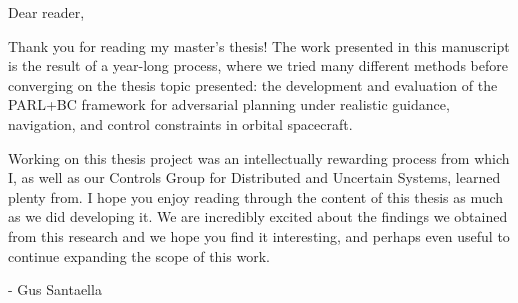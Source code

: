 \begin{preface}		%

Dear reader,

Thank you for reading my master's thesis! The work presented in this manuscript is the result of a year-long process, where we tried many different methods before converging on the thesis topic presented: the development and evaluation of the PARL+BC framework for adversarial planning under realistic guidance, navigation, and control constraints in orbital spacecraft.

Working on this thesis project was an intellectually rewarding process from which I, as well as our Controls Group for Distributed and Uncertain Systems, learned plenty from. I hope you enjoy reading through the content of this thesis as much as we did developing it. We are incredibly excited about the findings we obtained from this research and we hope you find it interesting, and perhaps even useful to continue expanding the scope of this work.

- Gus Santaella
\end{preface}

%
\utabstract

\tableofcontents   %

\listoftables      %
\listoffigures     %

\begin{glossary}

\end{glossary}



%
%

